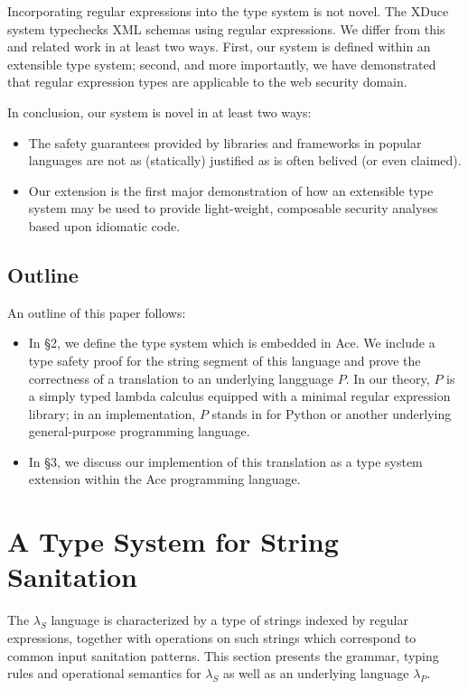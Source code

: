 \documentclass{acm_proc_article-sp}
\theoremstyle{definition}
\newcommand{\lambdas}{\lambda_S}
\newcommand{\lambdap}{\lambda_P}
\begin{document}
Incorporating regular expressions into the type system is not novel.
The XDuce system \cite{pierce} typechecks XML schemas using regular expressions.
We differ from this and related work in at least two ways.
First, our system  is defined within an extensible type system;
second, and more importantly, we have demonstrated that regular expression types
are applicable to the web security domain.

In conclusion, our system is novel in at least two ways:
\begin{itemize}
\item The safety guarantees provided by libraries and frameworks in popular languages
are not as (statically) justified as is often belived (or even claimed).
\item Our extension is the first major demonstration of how an extensible type
system may be used to provide light-weight, composable security analyses based upon
idiomatic code.
\end{itemize}

\subsection{Outline}

An outline of this paper follows:

\begin{itemize}
  \item In \S 2, we define the type system which is embedded in Ace. We include a type safety proof for the string
    segment of this language and prove the correctness of a translation to an underlying langguage $P$. In our theory,
    $P$ is a simply typed lambda calculus equipped with a minimal regular expression library; in an implementation, $P$
    stands in for Python or another underlying general-purpose programming language.
  \item In \S 3, we discuss our implemention of this translation as a type system extension  within the Ace programming language.
\end{itemize}

\section{A Type System for String Sanitation}

The $\lambdas$ language is characterized by a type of strings indexed by regular
expressions, together with operations on such strings which correspond to common
input sanitation patterns.
This section presents the grammar, typing rules and operational semantics for
$\lambdas$ as well as an underlying language $\lambdap$.
\end{document}
